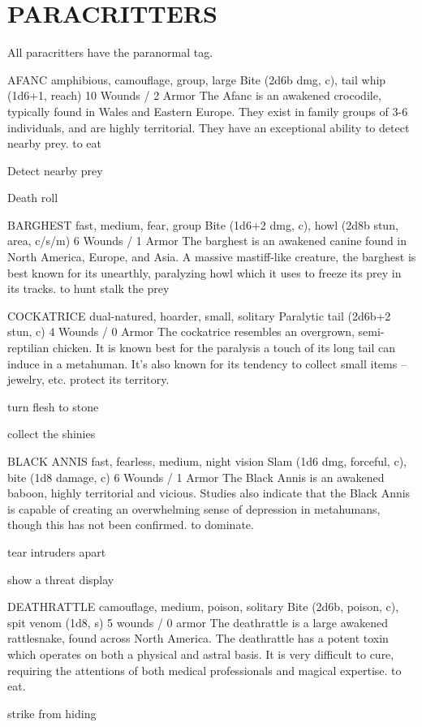 \documentclass[oneside,10pt]{article}
\begin{document}
\section{PARACRITTERS}
\begin{multicols}{2}
All paracritters have the paranormal tag.


\critterspec
{AFANC}
{amphibious, camouflage, group, large}
{Bite (2d6b dmg, c), tail whip (1d6+1, reach)}
{10 Wounds / 2 Armor}
{The Afanc is an awakened crocodile, typically found in Wales
and Eastern Europe. They exist in family groups of 3-6 individuals, and are highly territorial. They have an exceptional
ability to detect nearby prey.}
{to eat}
{\tcirc{} Detect nearby prey

\tcirc{} Death roll
}

\critterspec
{BARGHEST}
{fast, medium, fear, group}
{Bite (1d6+2 dmg, c), howl (2d8b stun, area, c/s/m)}
{6 Wounds / 1 Armor}
{The barghest is an awakened canine found in North America,
Europe, and Asia. A massive mastiff-like creature, the barghest is best known for its unearthly, paralyzing howl which it
uses to freeze its prey in its tracks.}
{to hunt}
{
\tcirc{} stalk the prey
}

\critterspec
{COCKATRICE}
{dual-natured, hoarder, small, solitary}
{Paralytic tail (2d6b+2 stun, c)}
{4 Wounds / 0 Armor}
{The cockatrice resembles an overgrown, semi-reptilian chicken. It is known best for the paralysis a touch of its long tail can induce in a metahuman. It’s also known for its tendency to collect small items -- jewelry, etc. }
{protect its territory.}
{\tcirc{} turn flesh to stone

\tcirc{} collect the shinies}

\critterspec
{BLACK ANNIS}
{fast, fearless, medium, night vision}
{Slam (1d6 dmg, forceful, c), bite (1d8 damage, c)}
{6 Wounds / 1 Armor}
{The Black Annis is an awakened baboon, highly territorial and vicious. Studies also indicate that the Black Annis is capable of creating an overwhelming sense of depression in metahumans, though this has not been confirmed. }
{to dominate.}
{\tcirc{} tear intruders apart

\tcirc{} show a threat display}


\critterspec
{DEATHRATTLE}
{camouflage, medium, poison, solitary}
{Bite (2d6b, poison, c), spit venom (1d8, s)}
{5 wounds / 0 armor}
{The deathrattle is a large awakened rattlesnake, found across North America. The deathrattle has a potent toxin which operates on both a physical and astral basis. It is very difficult to cure, requiring the attentions of both medical professionals and magical expertise.}
{to eat.}
{\tcirc{} strike from hiding

}
\end{multicols}
\end{document}

